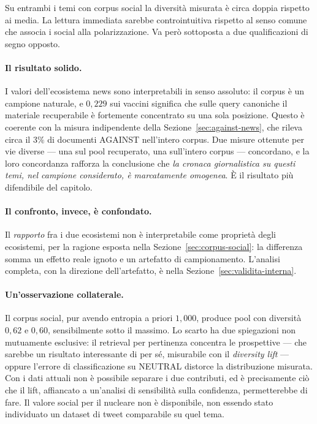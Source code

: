 \documentclass[11pt,a4paper]{report}
\begin{document}
Su entrambi i temi con corpus social la diversità misurata è circa doppia rispetto ai media. La
lettura immediata sarebbe controintuitiva rispetto al senso comune che associa i social alla
polarizzazione. Va però sottoposta a due qualificazioni di segno opposto.

\paragraph{Il risultato solido.} I valori dell'ecosistema news sono interpretabili in senso
assoluto: il corpus è un campione naturale, e $0{,}229$ sui vaccini significa che sulle query
canoniche il materiale recuperabile è fortemente concentrato su una sola posizione. Questo è
coerente con la misura indipendente della Sezione~\ref{sec:against-news}, che rileva circa il $3\%$
di documenti AGAINST nell'intero corpus. Due misure ottenute per vie diverse --- una sul pool
recuperato, una sull'intero corpus --- concordano, e la loro concordanza rafforza la conclusione
che \emph{la cronaca giornalistica su questi temi, nel campione considerato, è marcatamente
omogenea}. È il risultato più difendibile del capitolo.

\paragraph{Il confronto, invece, è confondato.} Il \emph{rapporto} fra i due ecosistemi non è
interpretabile come proprietà degli ecosistemi, per la ragione esposta nella
Sezione~\ref{sec:corpus-social}: la differenza somma un effetto reale ignoto e un artefatto di
campionamento. L'analisi completa, con la direzione dell'artefatto, è nella
Sezione~\ref{sec:validita-interna}.

\paragraph{Un'osservazione collaterale.} Il corpus social, pur avendo entropia a priori $1{,}000$,
produce pool con diversità $0{,}62$ e $0{,}60$, sensibilmente sotto il massimo. Lo scarto ha due
spiegazioni non mutuamente esclusive: il retrieval per pertinenza concentra le prospettive --- che
sarebbe un risultato interessante di per sé, misurabile con il \emph{diversity lift} --- oppure
l'errore di classificazione su NEUTRAL distorce la distribuzione misurata. Con i dati attuali non
è possibile separare i due contributi, ed è precisamente ciò che il lift, affiancato a un'analisi
di sensibilità sulla confidenza, permetterebbe di fare. Il valore social per il nucleare non è
disponibile, non essendo stato individuato un dataset di tweet comparabile su quel tema.
\end{document}
